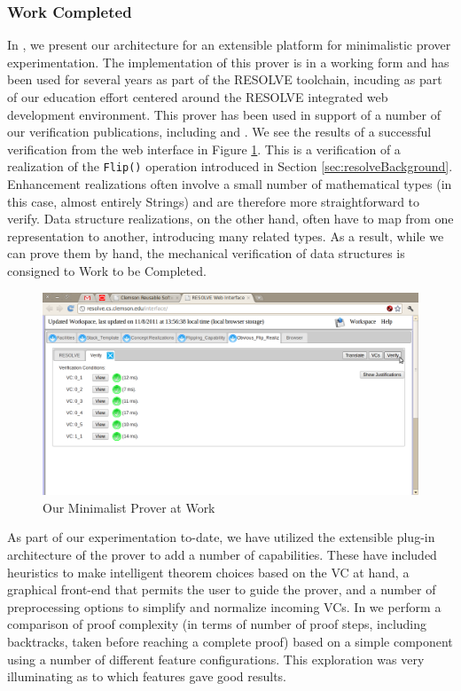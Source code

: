 \subsubsection{Work Completed}
In \cite{smith10}, we present our architecture for an extensible platform for minimalistic prover experimentation.  The implementation of this prover is in a working form and has been used for several years as part of the RESOLVE toolchain, incuding as part of our education effort centered around the RESOLVE integrated web development environment\cite{chuckThesis}.  This prover has been used in support of a number of our verification publications, including \cite{Sit11} and \cite{smithMinimalist}.  We see the results of a successful verification from the web interface in Figure \ref{fig:successfulverification}.  This is a verification of a realization of the \texttt{Flip()} operation introduced in Section \ref{sec:resolveBackground}.  Enhancement realizations often involve a small number of mathematical types (in this case, almost entirely Strings) and are therefore more straightforward to verify.  Data structure realizations, on the other hand, often have to map from one representation to another, introducing many related types.  As a result, while we can prove them by hand, the mechanical verification of data structures is consigned to Work to be Completed.

\begin{figure}
  \centering
    \includegraphics[width=\textwidth]{successfulverification}
  \caption{Our Minimalist Prover at Work\label{fig:successfulverification}}
\end{figure}

As part of our experimentation to-date, we have utilized the extensible plug-in architecture of the prover to add a number of capabilities.  These have included heuristics to make intelligent theorem choices based on the VC at hand, a graphical front-end that permits the user to guide the prover, and a number of preprocessing options to simplify and normalize incoming VCs.  In \cite{smithMinimalist} we perform a comparison of proof complexity (in terms of number of proof steps, including backtracks, taken before reaching a complete proof) based on a simple component using a number of different feature configurations.  This exploration was very illuminating as to which features gave good results.

